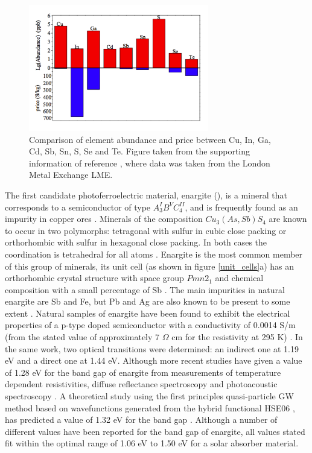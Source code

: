 \begin{figure}[h!]
  \centering
    \includegraphics[width=0.7\textwidth]{figures/abundance.png}
    \caption{Comparison of element abundance and price between Cu, In, Ga, Cd, Sb, Sn, S, Se and Te. Figure taken from the supporting information of reference , where data was taken from the London Metal Exchange LME.}
  \label{abundance}
\end{figure}

The first candidate photoferroelectric material, enargite (\enargite), is a mineral that corresponds to a semiconductor of type $A^I_3B^VC^{II}_4$, and is frequently found as an impurity in copper ores \cite{enargite_EIS}.
Minerals of the composition $Cu_3(As,Sb)S_4$ are known to occur in two polymorphs: tetragonal with sulfur in cubic close packing or orthorhombic with sulfur in hexagonal close packing. In both cases the coordination is tetrahedral for all atoms \cite{ores}. Enargite is the most common member of this group of minerals, its unit cell (as shown in figure \ref{unit_cells}a) has an orthorhombic crystal structure with space group $Pmn2_1$ and chemical composition \enargite with  a small percentage of Sb \cite{ores1}. The main impurities in natural enargite are Sb and Fe, but Pb and Ag are also known to be present to some extent \cite{enargite_EIS}.
Natural samples of enargite have been found to exhibit the electrical properties of a p-type doped semiconductor with a conductivity of  0.0014 S/m (from the stated value of approximately 7 $\Omega$ cm for the resistivity at 295 K) \cite{enargite_properties}. In the same work, two optical transitions were determined: an indirect one at 1.19 eV and a direct one at 1.44 eV. Although more recent studies have given a value of 1.28 eV for the band gap of enargite from measurements of temperature dependent resistivities, diffuse reflectance spectroscopy and photoacoustic spectroscopy  \cite{Dittrich1}. A theoretical study using the first principles quasi-particle GW method based on wavefunctions generated from the hybrid functional HSE06 \cite{HSE}, has predicted a value of 1.32 eV for the band gap \cite{Zunger}. Although a number of different values have been reported for the band gap of enargite, all values stated fit within the optimal range of 1.06 eV to 1.50 eV \cite{CZTS_book} for a solar absorber material.\\

